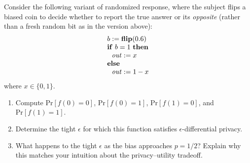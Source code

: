 \documentclass[11pt]{article}
\newcommand{\pr}{\mathrm{Pr}}
\newcommand{\flip}{\mathbf{flip}}
\begin{document}
\begin{task}\rm
  Consider the following variant of randomized response, where the subject
  flips a biased coin to decide whether to report the true answer or its
  \emph{opposite} (rather than a fresh random bit as in the version above):
  \[
    \begin{array}{l}
      b := \flip(0.6) \\
      \mathbf{if}\ b = 1\ \mathbf{then} \\
      \ \ \mi{out} := x \\
      \mathbf{else} \\
      \ \ \mi{out} := 1 - x
    \end{array}
  \]
  where $x \in \{0, 1\}$.
  \begin{enumerate}
  \item Compute $\pr[f(0) = 0]$, $\pr[f(0) = 1]$, $\pr[f(1) = 0]$, and
    $\pr[f(1) = 1]$.
  \item Determine the tight $\epsilon$ for which this function satisfies
    $\epsilon$-differential privacy.
  \item What happens to the tight $\epsilon$ as the bias approaches
    $p = 1/2$?  Explain why this matches your intuition about the
    privacy--utility tradeoff.
  \end{enumerate}
\end{task}



\end{document}
